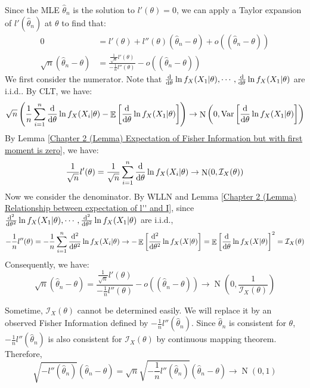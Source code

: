 \documentclass{huhtakm-template-book-v2}
\DeclareMathOperator{\E}{\mathbb{E}}
\DeclareMathOperator{\Var}{Var}
\DeclareMathOperator{\N}{N}
\begin{document}
\begin{proofing}
	Since the MLE $\hat{\theta}_{n}$ is the solution to $l'(\theta)=0$, we can apply a Taylor expansion of $l'(\hat{\theta}_{n})$ at $\theta$ to find that:
	\begin{align*}
		0&=l'(\theta)+l''(\theta)(\hat{\theta}_{n}-\theta)+o((\hat{\theta}_{n}-\theta))\\
		\sqrt{n}(\hat{\theta}_{n}-\theta)&=\frac{\frac{1}{\sqrt{n}}l'(\theta)}{-\frac{1}{n}l''(\theta)}-o((\hat{\theta}_{n}-\theta))
	\end{align*}
	We first consider the numerator. Note that $\odv*{}{\theta}\ln{f_{X}(X_{1}|\theta)},\cdots,\odv*{}{\theta}\ln{f_{X}(X_{1}|\theta)}$ are i.i.d.. By CLT, we have:
	\begin{equation*}
		\sqrt{n}\left(\frac{1}{n}\sum_{i=1}^{n}\odv*{}{\theta}\ln{f_{X}(X_{i}|\theta)}-\E\left[\odv*{}{\theta}\ln{f_{X}(X_{1}|\theta)}\right]\right)\to\N\left(0,\Var\left[\odv*{}{\theta}\ln{f_{X}(X_{1}|\theta)}\right]\right)
	\end{equation*}
	By Lemma \ref{Chapter 2 (Lemma) Expectation of Fisher Information but with first moment is zero}, we have:
	\begin{equation*}
		\frac{1}{\sqrt{n}}l'(\theta)=\frac{1}{\sqrt{n}}\sum_{i=1}^{n}\odv*{}{\theta}\ln{f_{X}(X_{i}|\theta)}\to\N(0,\mathcal{I}_{X}(\theta))
	\end{equation*}
	Now we consider the denominator. By WLLN and Lemma \ref{Chapter 2 (Lemma) Relationship between expectation of l'' and I}, since $\odv*[order={2}]{}{\theta}\ln{f_{X}(X_{1}|\theta)},\cdots,\odv*[order={2}]{}{\theta}\ln{f_{X}(X_{1}|\theta)}$ are i.i.d.,
	\begin{equation*}
		-\frac{1}{n}l''(\theta)=-\frac{1}{n}\sum_{i=1}^{n}\odv*[order={2}]{}{\theta}\ln{f_{X}(X_{i}|\theta)}\to-\E\left[\odv*[order={2}]{}{\theta}\ln{f_{X}(X|\theta)}\right]=\E\left[\odv*{}{\theta}\ln{f_{X}(X|\theta)}\right]^{2}=\mathcal{I}_{X}(\theta)
	\end{equation*}
	Consequently, we have:
	\begin{equation*}
		\sqrt{n}(\hat{\theta}_{n}-\theta)=\frac{\frac{1}{\sqrt{n}}l'(\theta)}{-\frac{1}{n}l''(\theta)}-o((\hat{\theta}_{n}-\theta))\to\N\left(0,\frac{1}{\mathcal{I}_{X}(\theta)}\right)
	\end{equation*}
\end{proofing}
\begin{rem}
	\label{Chapter 2 (Remark) Cases when Fisher Information cannot be determined easily}
	Sometime, $\mathcal{I}_{X}(\theta)$ cannot be determined easily. We will replace it by an observed Fisher Information defined by $-\frac{1}{n}l''(\hat{\theta}_{n})$. Since $\hat{\theta}_{n}$ is consistent for $\theta$, $-\frac{1}{n}l''(\hat{\theta}_{n})$ is also consistent for $\mathcal{I}_{X}(\theta)$ by continuous mapping theorem. Therefore,
	\begin{equation*}
		\sqrt{-l''(\hat{\theta}_{n})}(\hat{\theta}_{n}-\theta)=\sqrt{n}\sqrt{-\frac{1}{n}l''(\hat{\theta}_{n})}(\hat{\theta}_{n}-\theta)\to\N(0,1)
	\end{equation*}
\end{rem}
\end{document}
